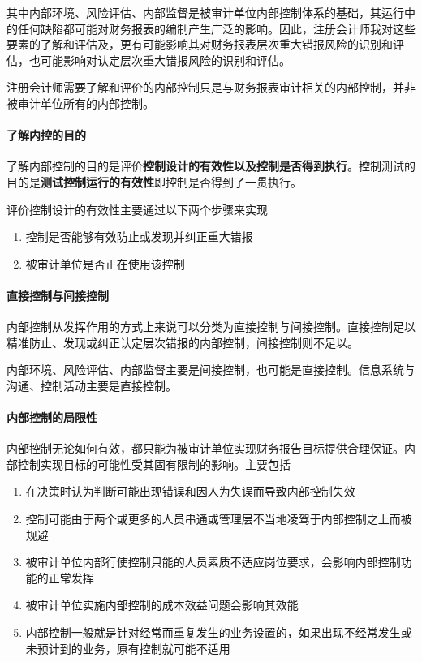 \documentclass[UTF8,12pt]{ctexart}
\numberwithin{equation}{section} %
\numberwithin{figure}{section}
\numberwithin{table}{section}
\begin{document}
	其中内部环境、风险评估、内部监督是被审计单位内部控制体系的基础，其运行中的任何缺陷都可能对财务报表的编制产生广泛的影响。因此，注册会计师我对这些要素的了解和评估及，更有可能影响其对财务报表层次重大错报风险的识别和评估，也可能影响对认定层次重大错报风险的识别和评估。
	
	注册会计师需要了解和评价的内部控制只是与财务报表审计相关的内部控制，并非被审计单位所有的内部控制。
	
	\paragraph{了解内控的目的}了解内部控制的目的是评价\textbf{控制设计的有效性以及控制是否得到执行}。控制测试的目的是\textbf{测试控制运行的有效性}即控制是否得到了一贯执行。
	
	评价控制设计的有效性主要通过以下两个步骤来实现
	\begin{enumerate}
		\item 控制是否能够有效防止或发现并纠正重大错报
		
		\item 被审计单位是否正在使用该控制
	\end{enumerate}
	
	\paragraph{直接控制与间接控制}内部控制从发挥作用的方式上来说可以分类为直接控制与间接控制。直接控制足以精准防止、发现或纠正认定层次错报的内部控制，间接控制则不足以。
	
	内部环境、风险评估、内部监督主要是间接控制，也可能是直接控制。信息系统与沟通、控制活动主要是直接控制。
	
	\paragraph{内部控制的局限性} 内部控制无论如何有效，都只能为被审计单位实现财务报告目标提供合理保证。内部控制实现目标的可能性受其固有限制的影响。主要包括
	\begin{enumerate}
		\item 在决策时认为判断可能出现错误和因人为失误而导致内部控制失效
		
		\item 控制可能由于两个或更多的人员串通或管理层不当地凌驾于内部控制之上而被规避
		
		\item 被审计单位内部行使控制只能的人员素质不适应岗位要求，会影响内部控制功能的正常发挥
		
		\item 被审计单位实施内部控制的成本效益问题会影响其效能
		
		\item 内部控制一般就是针对经常而重复发生的业务设置的，如果出现不经常发生或未预计到的业务，原有控制就可能不适用
	\end{enumerate}
	
\end{document}
